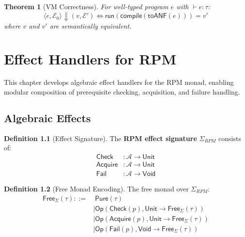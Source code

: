 \documentclass[11pt,twoside,openright]{book}
\theoremstyle{definition}
\newtheorem{definition}{Definition}[chapter]
\theoremstyle{plain}
\newtheorem{theorem}[definition]{Theorem}
\theoremstyle{remark}
\newcommand{\Acquisitions}{\mathcal{A}}
\newcommand{\bigstep}{\Downarrow}
\newcommand{\vnewtwo}{\textbf{v7.2 New}}
\begin{document}
\begin{theorem}[VM Correctness]
\label{thm:vm-correct}
For well-typed program $e$ with $\vdash e : \tau$:
\[
\langle e, \mathcal{E}_0 \rangle \bigstep (v, \mathcal{E}') \iff \mathsf{run}(\mathsf{compile}(\mathsf{toANF}(e))) = v'
\]
where $v$ and $v'$ are semantically equivalent.
\end{theorem}


\chapter{Effect Handlers for RPM}
\label{ch:effect-handlers}

\begin{tcolorbox}[colback=blue!5!white,colframe=blue!75!black,title=\vnewtwo]
This chapter develops algebraic effect handlers for the RPM monad, enabling modular composition of prerequisite checking, acquisition, and failure handling.
\end{tcolorbox}

\section{Algebraic Effects}

\begin{definition}[Effect Signature]
\label{def:effect-sig}
The \textbf{RPM effect signature} $\Sigma_{RPM}$ consists of:
\begin{align}
\mathsf{Check} &: \Acquisitions \to \mathsf{Unit} \\
\mathsf{Acquire} &: \Acquisitions \to \mathsf{Unit} \\
\mathsf{Fail} &: \Acquisitions \to \mathsf{Void}
\end{align}
\end{definition}

\begin{definition}[Free Monad Encoding]
\label{def:free-monad}
The free monad over $\Sigma_{RPM}$:
\begin{align}
\mathsf{Free}_{\Sigma}(\tau) ::=&\; \mathsf{Pure}(\tau) \\
    &\mid \mathsf{Op}(\mathsf{Check}(p), \mathsf{Unit} \to \mathsf{Free}_\Sigma(\tau)) \\
    &\mid \mathsf{Op}(\mathsf{Acquire}(p), \mathsf{Unit} \to \mathsf{Free}_\Sigma(\tau)) \\
    &\mid \mathsf{Op}(\mathsf{Fail}(p), \mathsf{Void} \to \mathsf{Free}_\Sigma(\tau))
\end{align}
\end{definition}
\end{document}

